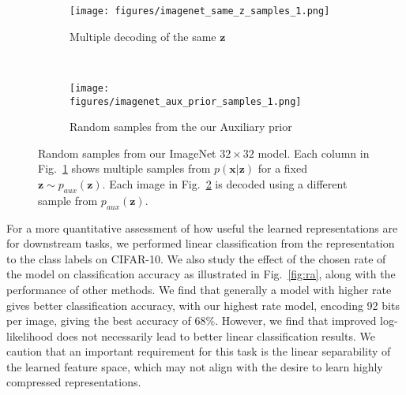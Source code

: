 \documentclass{article} \usepackage{iclr2019_conference,times}
\def\figref#1{figure~\ref{#1}}
\def\rvx{{\mathbf{x}}}
\def\rvz{{\mathbf{z}}}
\renewcommand{\figref}[1]{Fig.~\ref{#1}}
\begin{document}
\begin{figure}[h]
    \centering
    \begin{subfigure}{0.49\textwidth}
        \centering
        \texttt{[image: figures/imagenet\_same\_z\_samples\_1.png]}
        \caption{Multiple decoding of the same $\rvz$}        
        \label{fig:imagenet-samez}
    \end{subfigure}
    ~
    \begin{subfigure}{0.49\textwidth}
        \centering
        \texttt{[image: figures/imagenet\_aux\_prior\_samples\_1.png]}
        \caption{Random samples from the our Auxiliary prior}
        \label{fig:imagenet-aux}
    \end{subfigure}
    \caption{Random samples from our ImageNet $32\times 32$ model. Each column in \figref{fig:imagenet-samez} shows multiple samples from $p(\rvx|\rvz)$ for a fixed $\rvz \sim p_{aux}(\rvz)$. Each image in \figref{fig:imagenet-aux} is decoded using a different sample from $p_{aux}(\rvz)$.}
    \label{fig:samples-samez}
\end{figure}

For a more quantitative assessment of how useful the learned representations are for downstream tasks, we performed linear classification from the representation to the class labels on CIFAR-10. We also study the effect of the chosen rate of the model on classification accuracy as illustrated in \figref{fig:ra}, along with the performance of other methods. We find that generally a model with higher rate gives better classification accuracy, with our highest rate model, encoding 92 bits per image, giving the best accuracy of $68\%$. However, we find that improved log-likelihood does not necessarily lead to better linear classification results.  We caution that an important requirement for this task is the linear separability of the learned feature space, which may not align with the desire to learn highly compressed representations.
\end{document}
